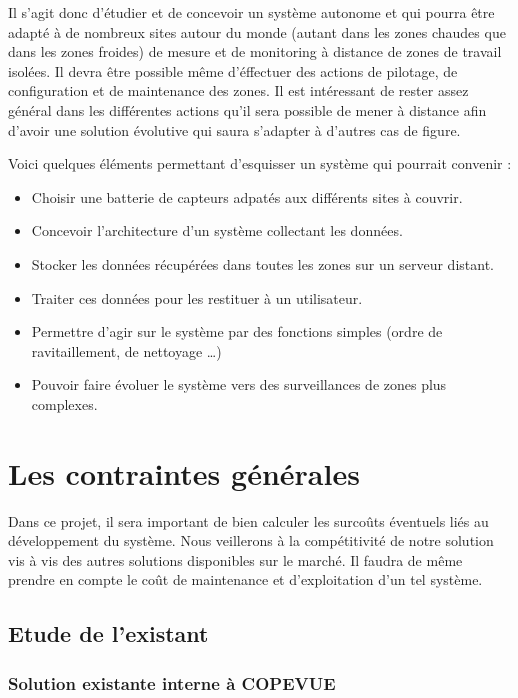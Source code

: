 Il s'agit donc d'étudier et de concevoir un système autonome et qui pourra être adapté à de nombreux sites autour du monde (autant dans les zones chaudes que dans les zones froides) de mesure et de monitoring à distance de zones de travail isolées. Il devra être possible même d'éffectuer des actions de pilotage, de configuration et de maintenance des zones. Il est intéressant de rester assez général dans les différentes actions qu'il sera possible de mener à distance afin d'avoir une solution évolutive qui saura s'adapter à d'autres cas de figure.

Voici quelques éléments permettant d'esquisser un système qui pourrait convenir :

\begin{itemize}
\item Choisir une batterie de capteurs adpatés aux différents sites à couvrir.
\item Concevoir l'architecture d'un système collectant les données.
\item Stocker les données récupérées dans toutes les zones sur un serveur distant.
\item Traiter ces données pour les restituer à un utilisateur.
\item Permettre d'agir sur le système par des fonctions simples (ordre de ravitaillement, de nettoyage …)
\item Pouvoir faire évoluer le système vers des surveillances de zones plus complexes.
\end{itemize}
    
\section{Les contraintes générales}

Dans ce projet, il sera important de bien calculer les surcoûts éventuels liés au développement du système. Nous veillerons à la compétitivité de notre solution vis à vis des autres solutions disponibles sur le marché. Il faudra de même prendre en compte le coût de maintenance et d'exploitation d'un tel système.

\subsection{Etude de l'existant}

\subsubsection{Solution existante interne à COPEVUE}

